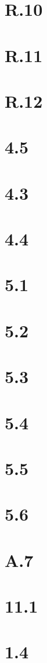 \documentclass[
	landscape       = true,
	lecture-caps    = {1.0, 1.0},
	recitation-days = F,
	quiz-days       = F,
	exam-days       = F,
]{schedule}
\begin{document}
\begin{schedule}
	\section{R.10}
	\section[2]{R.11}
	\section[2]{R.12}
	\section[2]{4.5}
	\section{4.3}
	\section{4.4}
	\examreview
	\exam[noquiz]

	\section{5.1}
	\section{5.2}
	\section{5.3}
	\section{5.4}
	\section{5.5}
	\section{5.6}
	\examreview
	\exam[noquiz]

	\section{A.7}
	\section{11.1}
	\section{1.4}

	\finalreview
	\finalsweek[12-10][5]
	\winterbreak

\end{schedule}
\end{document}
